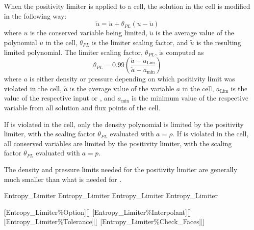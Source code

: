 \begin{nmldescbody}
When the positivity limiter is applied to a cell, the solution in the cell is
modified in the following way:
%
\begin{equation}
  \tilde{u} = \check{u} + \theta_{PL}\left(u-\check{u}\right)
  \label{EQN:PLSolution}
\end{equation}
%
where $u$ is the conserved variable being limited, $\check{u}$ is the average
value of the polynomial $u$ in the cell, $\theta_{PL}$ is the limiter scaling
factor, and $\tilde{u}$ is the resulting limited polynomial.
%
The limiter scaling factor, $\theta_{PL}$, is computed as
%
\begin{equation}
  \theta_{PL} = 0.99 \left(
                           \frac{\check{a}-a_{\textrm{Lim}}}
                                {\check{a}-a_{\textrm{min}}}
                     \right)
  \label{EQN:PLScalingFactor}
\end{equation}
%
where $a$ is either density or pressure depending on which positivity limit was
violated in the cell, $\check{a}$ is the average value of the variable $a$ in
the cell, $a_{\textrm{Lim}}$ is the value of the respective input
 or , and $a_{\textrm{min}}$ is
the minimum value of the respective variable from all solution and flux points
of the cell.

\NOTE
If  is violated in the cell, only the density polynomial
is limited by the positivity limiter, with the scaling factor $\theta_{PL}$
evaluated with $a=\rho$.
%
If  is violated in the cell, all conserved variables
are limited by the positivity limiter, with the scaling factor $\theta_{PL}$
evaluated with $a=p$.

\NOTE
The density and pressure limits needed for the positivity limiter are generally
much smaller than what is needed for .

\end{nmldescbody}


\FINALFIX{\newpage}
\begin{nmldescitem}
Entropy_Limiter%
Entropy_Limiter%
Entropy_Limiter%
Entropy_Limiter%
\end{nmldescitem}
[Entropy\_Limiter\%Option][]
[Entropy\_Limiter\%Interpolant][]
[Entropy\_Limiter\%Tolerance][]
[Entropy\_Limiter\%Check\_Faces][]

